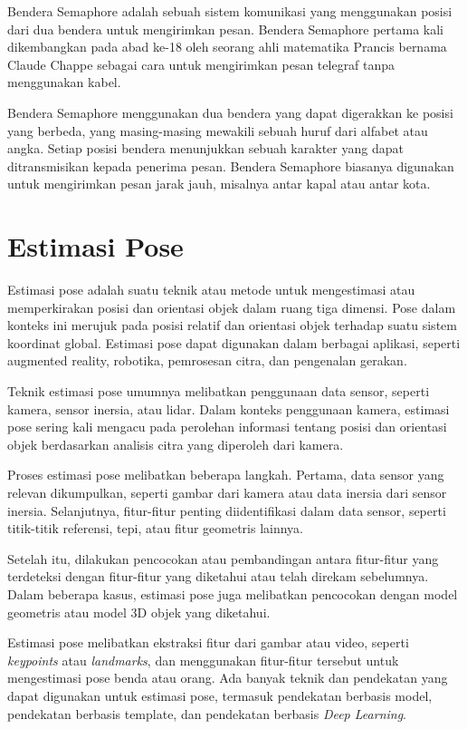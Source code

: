 Bendera Semaphore adalah sebuah sistem komunikasi yang menggunakan posisi dari dua bendera untuk mengirimkan pesan. Bendera Semaphore pertama kali dikembangkan pada abad ke-18 oleh seorang ahli matematika Prancis bernama Claude Chappe sebagai cara untuk mengirimkan pesan telegraf tanpa menggunakan kabel. \cite{8752707}

Bendera Semaphore menggunakan dua bendera yang dapat digerakkan ke posisi yang berbeda, yang masing-masing mewakili sebuah huruf dari alfabet atau angka. Setiap posisi bendera menunjukkan sebuah karakter yang dapat ditransmisikan kepada penerima pesan. Bendera Semaphore biasanya digunakan untuk mengirimkan pesan jarak jauh, misalnya antar kapal atau antar kota. \cite{gundogdu2019semaphore} 

\section{Estimasi Pose}

Estimasi pose adalah suatu teknik atau metode untuk mengestimasi atau memperkirakan posisi dan orientasi objek dalam ruang tiga dimensi. Pose dalam konteks ini merujuk pada posisi relatif dan orientasi objek terhadap suatu sistem koordinat global. Estimasi pose dapat digunakan dalam berbagai aplikasi, seperti augmented reality, robotika, pemrosesan citra, dan pengenalan gerakan.

Teknik estimasi pose umumnya melibatkan penggunaan data sensor, seperti kamera, sensor inersia, atau lidar. Dalam konteks penggunaan kamera, estimasi pose sering kali mengacu pada perolehan informasi tentang posisi dan orientasi objek berdasarkan analisis citra yang diperoleh dari kamera.

Proses estimasi pose melibatkan beberapa langkah. Pertama, data sensor yang relevan dikumpulkan, seperti gambar dari kamera atau data inersia dari sensor inersia. Selanjutnya, fitur-fitur penting diidentifikasi dalam data sensor, seperti titik-titik referensi, tepi, atau fitur geometris lainnya.

Setelah itu, dilakukan pencocokan atau pembandingan antara fitur-fitur yang terdeteksi dengan fitur-fitur yang diketahui atau telah direkam sebelumnya. Dalam beberapa kasus, estimasi pose juga melibatkan pencocokan dengan model geometris atau model 3D objek yang diketahui. \cite{Andriluka_2014_CVPR}

Estimasi pose melibatkan ekstraksi fitur dari gambar atau video, seperti \textit{keypoints} atau \textit{landmarks}, dan menggunakan fitur-fitur tersebut untuk mengestimasi pose benda atau orang. Ada banyak teknik dan pendekatan yang dapat digunakan untuk estimasi pose, termasuk pendekatan berbasis model, pendekatan berbasis template, dan pendekatan berbasis \textit{Deep Learning}. \cite{Toshev_2014_CVPR}

